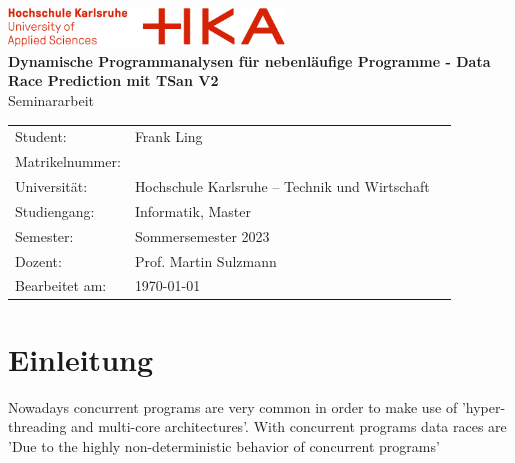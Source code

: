 \documentclass[12pt]{article}
\begin{document}
	\begin{titlepage}
		\begin{center}
			\includegraphics[width=0.55\textwidth]{images/hka-logo.png}\\[16ex]
			\LARGE{\textbf{Dynamische Programmanalysen für nebenläufige Programme - Data Race Prediction mit TSan V2}}\\[8ex]
			\Large{{Seminararbeit}}\\[14ex]
			\normalsize{}
			\begin{tabular}{lll}
				Student:            & \quad Frank Ling                                  & \\[2ex]
				Matrikelnummer:     & \quad 79496 & \\[2ex]     %
				Universität:        & \quad Hochschule Karlsruhe – Technik und Wirtschaft   &       \\[2ex]
				Studiengang:        & \quad Informatik, Master                &       \\[2ex]
				Semester:           & \quad Sommersemester 2023                             &       \\[2ex]
				Dozent:             & \quad Prof. Martin Sulzmann                       &       \\[2ex]
				Bearbeitet am:      & \quad \today                                  &       \\[2ex]
			\end{tabular}
		\end{center}
	\end{titlepage}
	\newpage
	\tableofcontents
	\newpage
	\section{Einleitung}
	Nowadays concurrent programs are very common in order to make use of 'hyper-threading and multi-core architectures'\cite[p. 14]{SWB-1830643851}. With concurrent programs data races are 'Due to the highly non-deterministic behavior of concurrent programs' \cite[p. 1]{sulzmann}
	
\end{document}
